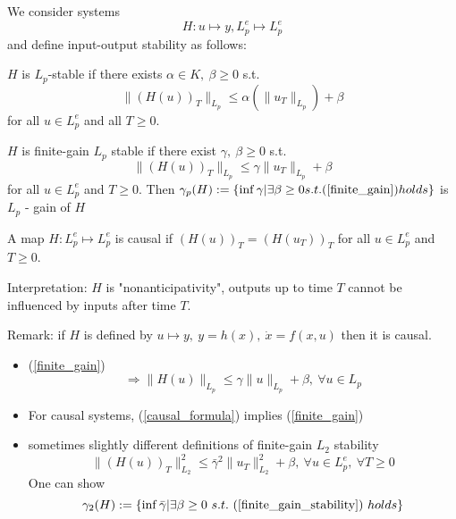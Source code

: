 We consider systems 
\begin{equation*}
H: u \mapsto y, L_p^e \mapsto L_p^e
\end{equation*}
and define input-output stability as follows:
\begin{Definition}
$H$ is $L_p$-stable if there exists $\alpha \in K, \ \beta \geq 0$ s.t. 
\begin{equation*}
\|(H(u))_T\|_{L_p} \leq \alpha (\|u_T\|_{L_p}) + \beta
\end{equation*}
for all $u \in L^e_p$ and all $T \geq 0$. 

$H$ is finite-gain $L_p$ stable if there exist $\gamma, \ \beta \geq 0$ s.t. 
\begin{equation}\label{finite_gain}
\|(H(u))_T\|_{L_p} \leq \gamma \|u_T\|_{L_p} + \beta 
\end{equation}
for all $u \in L_p^e$ and $T \geq 0$. Then $\gamma_p(H) := \{ \inf \gamma | \exists \beta \geq 0 s.t. (\ref{finite_gain}) holds\}$ is $L_p$ - gain of $H$
\end{Definition}
\begin{Definition}
A map $H: L_p^e \mapsto L_p^e$ is causal if $(H(u))_T = (H(u_T))_T$ for all $u \in L_p^e$ and $T \geq 0$. 
\end{Definition}

Interpretation: $H$ is "nonanticipativity", outputs up to time $T$ cannot be influenced by inputs after time $T$.

Remark: if $H$ is defined by $u \mapsto y, \ y = h(x), \ \dot{x} = f(x,u)$ then it is causal.
\begin{itemize}
\item (\ref{finite_gain})
\begin{equation}\label{causal_formula}
\Rightarrow \|H(u)\|_{L_p} \leq \gamma \|u\|_{L_p} + \beta, \ \forall u \in L_p
\end{equation}
\item For causal systems, (\ref{causal_formula}) implies (\ref{finite_gain})
\item sometimes slightly different definitions of finite-gain $L_2$ stability
\begin{equation}\label{finite_gain_stability}
\|(H(u))_T\|^2_{L_2} \leq \bar{\gamma}^2 \|u_T\|^2_{L_2} + \beta, \ \forall u \in L_p^e, \ \forall T \geq 0
\end{equation}
One can show 
\begin{equation*}
\gamma_2(H) := \{ \inf \bar{\gamma} | \exists \beta \geq 0 \ s.t. \ (\ref{finite_gain_stability})\ holds \}
\end{equation*}
\end{itemize}

